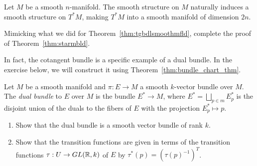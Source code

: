 \begin{theorem}\label{thm:starmbld}
	Let $M$ be a smooth $n$-manifold.
	The smooth structure on $M$ naturally induces a smooth structure on $T^*M$, making $T^*M$ into a smooth manifold of dimension $2n$.
\end{theorem}
\begin{exercise}\label{exe:prooftstarmbld}
	Mimicking what we did for Theorem~\ref{thm:tgbdlsmoothmfld}, complete the proof of Theorem~\ref{thm:starmbld}.
\end{exercise}

In fact, the cotangent bundle is a specific example of a dual bundle.
In the exercise below, we will construct it using Theorem~\ref{thm:bundle_chart_thm}.
\begin{exercise}
	Let $M$ be a smooth manifold and $\pi:E\to M$ a smooth $k$-vector bundle over $M$.
	The \emph{dual bundle} to $E$ over $M$ is the bundle $E^* \to M$, where $E^* = \bigsqcup_{p\in m} E_p^*$ is the disjoint union of the duals to the fibers of $E$ with the projection $E_p^* \mapsto p$.
	\begin{enumerate}
		\item Show that the dual bundle is a smooth vector bundle of rank $k$.
		\item Show that the transition functions are given in terms of the transition functions $\tau : U\to GL(\mathbb{R},k)$ of $E$ by $\tau^*(p) = (\tau(p)^{-1})^T$.
	\end{enumerate}
\end{exercise}

